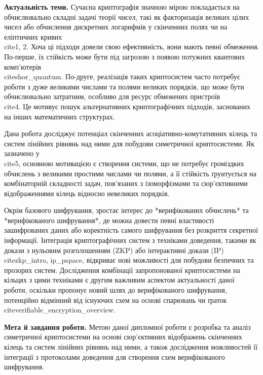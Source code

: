 \documentclass[a4paper,12pt]{article}
\begin{document}
    \textbf{Актуальність теми.} Сучасна криптографія значною мірою покладається на обчислювально складні задачі теорії чисел, такі як факторизація великих цілих чисел або обчислення дискретних логарифмів у скінченних полях чи на еліптичних кривих \\cite{1, 2}. Хоча ці підходи довели свою ефективність, вони мають певні обмеження. По-перше, їх стійкість може бути під загрозою з появою потужних квантових комп'ютерів \\cite{shor_quantum}. По-друге, реалізація таких криптосистем часто потребує роботи з дуже великими числами та полями великих порядків, що може бути обчислювально затратним, особливо для ресурс обмежених пристроїв \\cite{4}. Це мотивує пошук альтернативних криптографічних підходів, заснованих на інших математичних структурах.

    Дана робота досліджує потенціал скінченних асоціативно-комутативних кілець та систем лінійних рівнянь над ними для побудови симетричної криптосистеми. Як зазначено у \\cite{5}, основною мотивацією є створення системи, що не потребує громіздких обчислень з великими простими числами чи полями, а її стійкість ґрунтується на комбінаторній складності задач, пов'язаних з ізоморфізмами та сюр'єктивними відображеннями кілець відносно невеликих порядків.

    Окрім базового шифрування, зростає інтерес до *верифікованих обчислень* та *верифікованого шифрування*, де можна довести певні властивості зашифрованих даних або коректність самого шифрування без розкриття секретної інформації. Інтеграція криптографічних систем з техніками доведення, такими як докази з нульовим розголошенням (ZKP) або інтерактивні докази (IP) \\cite{zkp_intro, ip_pspace}, відкриває нові можливості для побудови безпечних та прозорих систем. Дослідження комбінації запропонованої криптосистеми на кільцях з цими техніками є другим важливим аспектом актуальності даної роботи, оскільки пропонує новий шлях до верифікованого шифрування, потенційно відмінний від існуючих схем на основі спарювань чи ґраток \\cite{verifiable_encryption_overview}.

    \textbf{Мета й завдання роботи.} Метою даної дипломної роботи є розробка та аналіз симетричної криптосистеми на основі сюр'єктивних відображень скінченних кілець та систем лінійних рівнянь над ними, а також дослідження можливостей її інтеграції з протоколами доведення для створення схем верифікованого шифрування.
\end{document}
